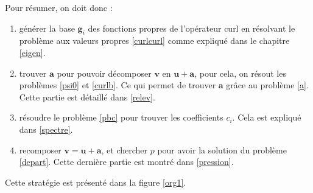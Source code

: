 
Pour résumer, on doit donc :
\begin{enumerate}
\item générer la base $\mathbf{g}_i$ des fonctions propres de l'opérateur curl en résolvant le problème aux valeurs propres \ref{curlcurl} comme expliqué dans le chapitre \ref{eigen}.
\item trouver $\mathbf{a}$ pour pouvoir décomposer $\mathbf{v}$ en $\mathbf{u}+\mathbf{a}$, pour cela, on résout les problèmes \ref{psi0} et \ref{curlb}. Ce qui permet de trouver $\mathbf{a}$ grâce au problème \ref{a}. Cette partie est détaillé dans \ref{relev}.
\item résoudre le problème \ref{pbc} pour trouver les coefficients $c_i$. Cela est expliqué dans \ref{spectre}.
\item recomposer $\mathbf{v}=\mathbf{u}+\mathbf{a}$, et chercher $p$ pour avoir la solution du problème \ref{depart}. Cette dernière partie est montré dans \ref{pression}.
\end{enumerate}
Cette stratégie est présenté dans la figure \ref{org1}.
